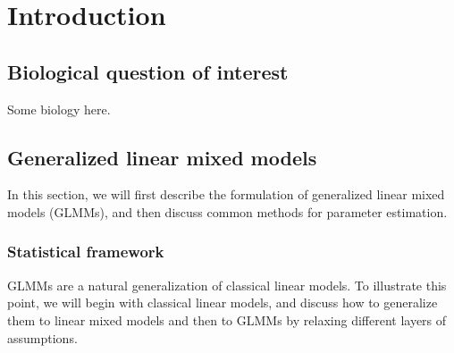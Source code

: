 	
\section{Introduction}\label{sec:intro}
	
\subsection{Biological question of interest}\label{subsec:biol}
	Some biology here.
	
	
\subsection{Generalized linear mixed models}\label{subsec:glmm}
	In this section, we will first describe the formulation of generalized linear mixed models (GLMMs), and then discuss common methods for parameter estimation. 
	\subsubsection{Statistical framework}\label{subsubsec:intro-stat-framework}
	GLMMs are a natural generalization of classical linear models. To illustrate this point, we will begin with classical linear models, and discuss how to generalize them to linear mixed models and then to GLMMs by relaxing different layers of assumptions. 
